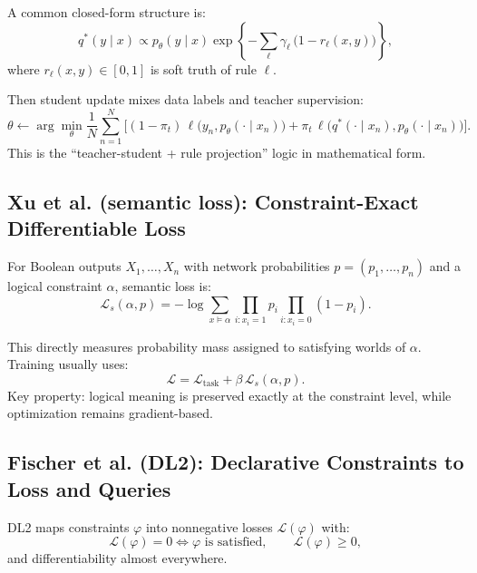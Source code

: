 ﻿\documentclass[11pt,a4paper]{article}
\begin{document}
A common closed-form structure is:
\begin{equation}
q^{\ast}(y\mid x) \propto p_{\theta}(y\mid x)
\exp\!\left\{-\sum_{\ell} \gamma_{\ell}\,\big(1-r_{\ell}(x,y)\big)\right\},
\label{eq:teacher}
\end{equation}
where $r_{\ell}(x,y) \in [0,1]$ is soft truth of rule $\ell$.

Then student update mixes data labels and teacher supervision:
\begin{equation}
\theta \leftarrow \arg\min_{\theta} \frac{1}{N}\sum_{n=1}^{N}
\Big[(1-\pi_t)\,\ell\big(y_n,p_{\theta}(\cdot\mid x_n)\big)
+ \pi_t\,\ell\big(q^{\ast}(\cdot\mid x_n),p_{\theta}(\cdot\mid x_n)\big)\Big].
\label{eq:distill}
\end{equation}
This is the ``teacher-student + rule projection'' logic in mathematical form.

\subsection{Xu et al. (semantic loss): Constraint-Exact Differentiable Loss}
For Boolean outputs $X_1,\dots,X_n$ with network probabilities $p=(p_1,\dots,p_n)$ and a logical constraint $\alpha$, semantic loss is:
\begin{equation}
\mathcal{L}_{s}(\alpha,p)
= -\log \sum_{x \models \alpha}
\prod_{i: x_i=1} p_i \prod_{i: x_i=0}(1-p_i).
\label{eq:semantic_loss}
\end{equation}

This directly measures probability mass assigned to satisfying worlds of $\alpha$. Training usually uses:
\begin{equation}
\mathcal{L} = \mathcal{L}_{\text{task}} + \beta\,\mathcal{L}_{s}(\alpha,p).
\label{eq:semantic_total}
\end{equation}
Key property: logical meaning is preserved exactly at the constraint level, while optimization remains gradient-based.

\subsection{Fischer et al. (DL2): Declarative Constraints to Loss and Queries}
DL2 maps constraints $\varphi$ into nonnegative losses $\mathcal{L}(\varphi)$ with:
\begin{equation}
\mathcal{L}(\varphi)=0 \iff \varphi \text{ is satisfied},
\qquad
\mathcal{L}(\varphi) \ge 0,
\label{eq:dl2_property}
\end{equation}
and differentiability almost everywhere.
\end{document}
